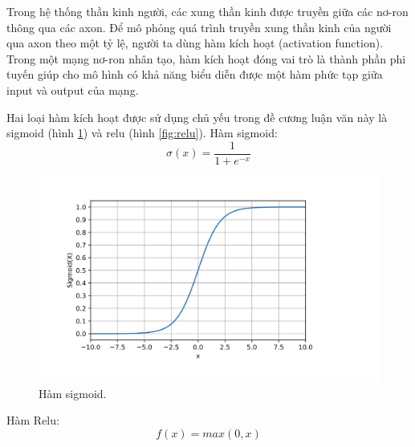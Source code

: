 \begin{itemize}
          Trong hệ thống thần kinh người, các xung thần kinh được truyền giữa các nơ-ron thông qua các axon. Để  mô phỏng quá trình truyền xung thần kinh của người qua axon theo một tỷ lệ, người ta dùng hàm kích hoạt (activation function). Trong một mạng nơ-ron nhân tạo, hàm kích hoạt đóng vai trò là thành phần phi tuyến giúp cho mô hình có khả năng biểu diễn được một hàm phức tạp giữa input và output của mạng.

          Hai loại hàm kích hoạt được sử dụng chủ yếu trong đề cương luận văn này là sigmoid (hình \ref{fig:sigmoid}) và relu (hình \ref{fig:relu}).
          Hàm sigmoid:
          \begin{equation}
              \sigma(x) = \frac{1}{1+e^{-x}}
          \end{equation}

          \begin{figure}[t]
              \begin{center}
                  \includegraphics[scale=0.2]{asset/image/sigmoid.png}
                  \caption{Hàm sigmoid. }
                  \label{fig:sigmoid}
              \end{center}
          \end{figure}


          Hàm Relu:
          \begin{equation}
              f(x) = max(0,x)
          \end{equation}


\end{itemize}
